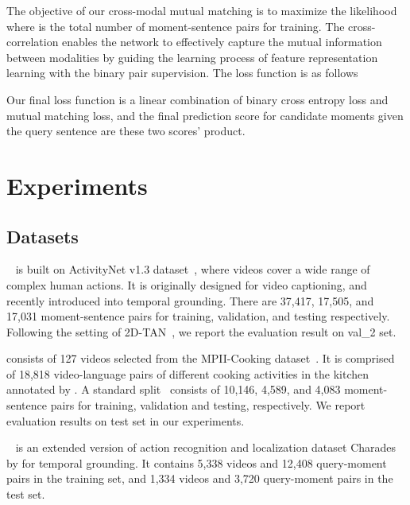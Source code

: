 \documentclass[letterpaper]{article} \usepackage{aaai22}  \usepackage{times}  \usepackage{helvet}  \usepackage{courier}  \usepackage[hyphens]{url}  \usepackage{graphicx} \urlstyle{rm} \def\UrlFont{\rm}  \usepackage{natbib}  \usepackage{caption} \DeclareCaptionStyle{ruled}{labelfont=normalfont,labelsep=colon,strut=off} \frenchspacing  \setlength{\pdfpagewidth}{8.5in}  \setlength{\pdfpageheight}{11in}  \usepackage{algorithm}
\begin{document}
The objective of our cross-modal mutual matching is to maximize the likelihood  where  is the total number of moment-sentence pairs for training. The cross-correlation enables the network to effectively capture the mutual information between modalities by guiding the learning process of feature representation learning with the binary pair supervision. The loss function is as follows



Our final loss function  is a linear combination of binary cross entropy loss and mutual matching loss, and the final prediction score  for candidate moments given the query sentence are these two scores' product.


\section{Experiments}
\subsection{Datasets}
~\cite{DBLP:conf/iccv/KrishnaHRFN17} is built on ActivityNet v1.3 dataset~\cite{DBLP:conf/cvpr/HeilbronEGN15}, where videos cover a wide range of complex human actions. It is originally designed for video captioning, and recently introduced into temporal grounding. There are 37,417, 17,505, and 17,031 moment-sentence pairs for training, validation, and testing respectively. Following the setting of 2D-TAN~\cite{DBLP:conf/aaai/ZhangPFL20}, we report the evaluation result on val\_2 set. 

 consists of 127 videos selected from the MPII-Cooking dataset~\cite{DBLP:conf/eccv/RohrbachRAAPS12}. It is comprised of 18,818 video-language pairs of different cooking activities in the kitchen annotated by \cite{DBLP:journals/tacl/RegneriRWTSP13}. A standard split~\cite{DBLP:conf/iccv/GaoSYN17} consists of 10,146, 4,589, and 4,083 moment-sentence pairs for training, validation and testing, respectively. We report evaluation results on test set in our experiments.

~\cite{DBLP:conf/iccv/GaoSYN17} is an extended version of action recognition and localization dataset Charades~\cite{DBLP:conf/eccv/SigurdssonVWFLG16} by \cite{DBLP:conf/iccv/GaoSYN17} for temporal grounding. It contains 5,338 videos and 12,408 query-moment pairs in the training set, and 1,334 videos and 3,720 query-moment pairs in the test set.
\end{document}
